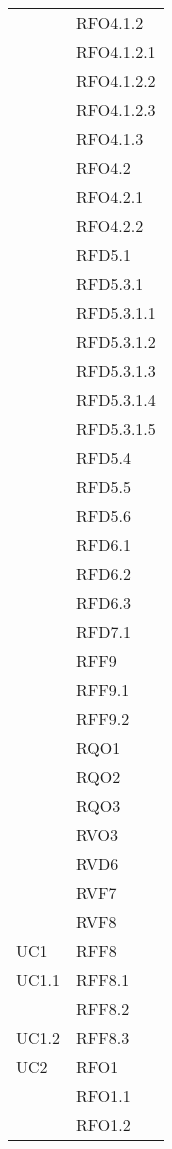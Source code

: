 \begin{center}
\begin{longtable}{ | >{\centering\arraybackslash}m{5cm} | >{\centering\arraybackslash}m{5cm} | }
            & RFO4.1.2 \\
            & RFO4.1.2.1 \\
            & RFO4.1.2.2 \\
            & RFO4.1.2.3 \\
            & RFO4.1.3 \\
            & RFO4.2 \\
            & RFO4.2.1 \\
            & RFO4.2.2 \\
            & RFD5.1 \\
            & RFD5.3.1 \\
            & RFD5.3.1.1 \\
            & RFD5.3.1.2 \\
            & RFD5.3.1.3 \\
            & RFD5.3.1.4 \\
            & RFD5.3.1.5 \\
            & RFD5.4 \\
            & RFD5.5 \\
            & RFD5.6 \\
            & RFD6.1 \\
            & RFD6.2 \\
            & RFD6.3 \\
            & RFD7.1 \\
            & RFF9 \\
            & RFF9.1 \\
            & RFF9.2 \\
            & RQO1 \\
            & RQO2 \\
            & RQO3 \\
            & RVO3 \\
            & RVD6 \\
            & RVF7 \\
            & RVF8 \\
\hline

        UC1 & RFF8\\
\hline

        UC1.1 & RFF8.1\\
            & RFF8.2 \\
\hline

        UC1.2 & RFF8.3\\
\hline

        UC2 & RFO1\\
            & RFO1.1 \\
            & RFO1.2 \\
\hline


\end{longtable}
\end{center}

